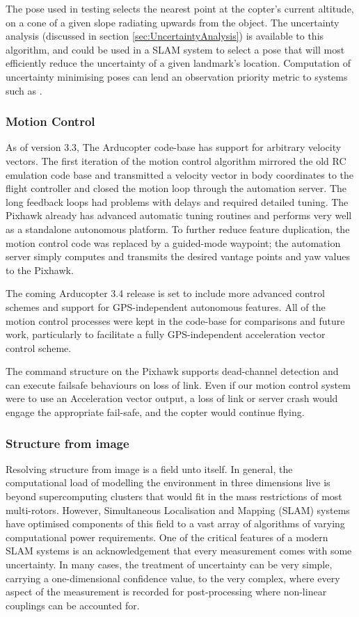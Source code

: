 \documentclass{article}
\begin{document}
      The pose used in testing selects the nearest point at the copter's current altitude, on a cone of a given slope radiating upwards from the object.
      The uncertainty analysis (discussed in section \ref{sec:UncertaintyAnalysis}) is available to this algorithm, and could be used in a SLAM system to select a pose that will most efficiently reduce the uncertainty of a given landmark's location.  Computation of uncertainty minimising poses can lend an observation priority metric to systems such as \cite{TrilatUnderwater}.

    \subsubsection{Motion Control}
      As of version 3.3, The Arducopter code-base has support for arbitrary velocity vectors.  The first iteration of the motion control algorithm mirrored the old RC emulation code base and transmitted a velocity vector in body coordinates to the flight controller and closed the motion loop through the automation server.  The long feedback loops had problems with delays and required detailed tuning.
      The Pixhawk already has advanced automatic tuning routines and performs very well as a standalone autonomous platform.  To further reduce feature duplication, the motion control code was replaced by a guided-mode waypoint; the automation server simply computes and transmits the desired vantage points and yaw values to the Pixhawk.

      The coming Arducopter 3.4 release is set to include more advanced control schemes and support for GPS-independent autonomous features.  All of the motion control processes were kept in the code-base for comparisons and future work, particularly to facilitate a fully GPS-independent acceleration vector control scheme.

      The command structure on the Pixhawk supports dead-channel detection and can execute failsafe behaviours on loss of link.  Even if our motion control system were to use an Acceleration vector output, a loss of link or server crash would engage the appropriate fail-safe, and the copter would continue flying.

    \subsubsection{Structure from image}
      Resolving structure from image is a field unto itself.  In general, the computational load of modelling the environment in three dimensions live is beyond supercomputing clusters that would fit in the mass restrictions of most multi-rotors.  However, Simultaneous Localisation and Mapping (SLAM) systems have optimised components of this field to a vast array of algorithms of varying computational power requirements.
      One of the critical features of a modern SLAM systems is an acknowledgement that every measurement comes with some uncertainty. 
      In many cases, the treatment of uncertainty can be very simple, carrying a one-dimensional confidence value, to the very complex, where every aspect of the measurement is recorded for post-processing where non-linear couplings can be accounted for.
\end{document}
